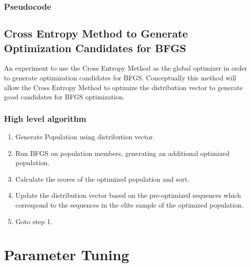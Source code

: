 \documentclass[conference,letterpaper]{IEEEtran}
\begin{document}
\subsubsection{Pseudocode}


\subsection{Cross Entropy Method to Generate Optimization Candidates for BFGS}
\par An experiment to use the Cross Entropy Method as the global optimizer in order to generate optimization candidates for BFGS. Conceptually this method will allow the Cross Entropy Method to optimize the distribution vector to generate good candidates for BFGS optimization.
\subsubsection{High level algorithm}
\begin{enumerate}
    \item Generate Population using distribution vector.
    \item Run BFGS on population members, generating an additional optimized population.
    \item Calculate the scores of the optimized population and sort.
    \item Update the distribution vector based on the pre-optimized sequences which correspond to the sequences in the elite sample of the optimized population.
    \item Goto step 1.
\end{enumerate}

\section{Parameter Tuning}
\par 
\end{document}
